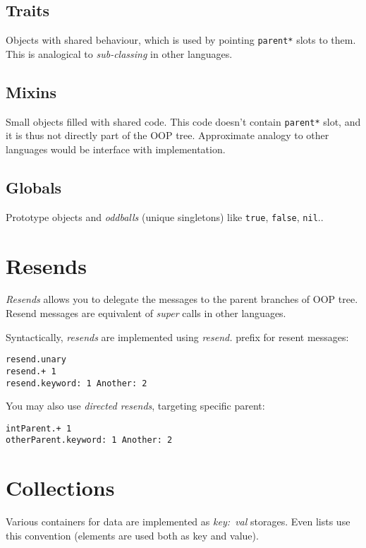 \documentclass[10pt]{article}
\begin{document}
\begin{multicols*}{3}
\subsection{Traits}
Objects with shared behaviour, which is used by pointing \texttt{parent*} slots to them. This is analogical to \textit{sub-classing} in other languages.



\subsection{Mixins}

Small objects filled with shared code. This code doesn't contain \texttt{parent*} slot, and it is thus not directly part of the OOP tree. Approximate analogy to other languages would be interface with implementation.



\subsection{Globals}
Prototype objects and \textit{oddballs} (unique singletons) like \texttt{true}, \texttt{false}, \texttt{nil}..




\section{Resends}

\textit{Resends} allows you to delegate the messages to the parent branches of OOP tree. Resend messages are equivalent of \textit{super} calls in other languages.

Syntactically, \textit{resends} are implemented using \textit{resend.} prefix for resent messages:

\begin{lstlisting}
resend.unary
resend.+ 1
resend.keyword: 1 Another: 2
\end{lstlisting}

You may also use \textit{directed resends}, targeting specific parent:

\begin{lstlisting}
intParent.+ 1
otherParent.keyword: 1 Another: 2
\end{lstlisting}



\vfill
\columnbreak
\section{Collections}
Various containers for data are implemented as \textit{key:\ val} storages. Even lists use this convention (elements are used both as key and value).


\end{multicols*}
\end{document}

